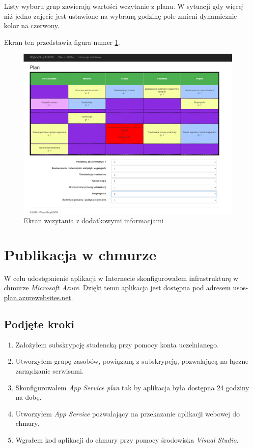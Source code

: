 \documentclass{mwart}
\begin{document}
Listy wyboru grup zawierają wartości wczytanie z planu. W sytuacji gdy więcej niż jedno zajęcie jest ustawione na wybraną godzinę pole zmieni dynamicznie kolor na czerwony.

Ekran ten przedstawia figura numer \ref{fig:ekranPlanu1}.

\begin{figure}[h]
    \centering
    \includegraphics[width=13cm]{Wczytany_plan1.png}
    \caption{Ekran wczytania z dodatkowymi informacjami}
    \label{fig:ekranPlanu1}
\end{figure}


\section{Publikacja w chmurze} \label{sec:chmura}
W celu udostępnienie aplikacji w Internecie skonfigurowałem infrastrukturę w chmurze \textit{Microsoft Azure}. Dzięki temu aplikacja jest dostępna pod adresem \hyperlink{http://usos-plan.azurewebsites.net}{usos-plan.azurewebsites.net}.

\subsection{Podjęte kroki}
\begin{enumerate}
\item Założyłem subskrypcję studencką przy pomocy konta uczelnianego.
\item Utworzyłem grupę zasobów, powiązaną z subskrypcją, pozwalającą na łączne zarządzanie serwisami.
\item Skonfigurowałem \textit{App Service plan} tak by aplikacja była dostępna 24 godziny na dobę.
\item Utworzyłem \textit{App Service} pozwalający na przekazanie aplikacji webowej do chmury.
\item Wgrałem kod aplikacji do chmury przy pomocy środowiska \textit{Visual Studio}.
\end{enumerate}
\end{document}
